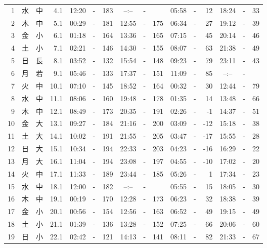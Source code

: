 \documentclass[12pt.a4j]{jsarticle}
\begin{document}
\begin{center}
\begin{table}[ht]
\begin{tabular}{|rc|cr|ccrccr|ccrccr|}
 \hline
 1 & 水 & 中 &  4.1 &  12:20 &-& 183  &  --:-- &-&     &   05:58 &-&  12  &   18:24 &-&  33  \\
 2 & 木 & 中 &  5.1 &  00:29 &-& 181  &  12:55 &-& 175  &   06:34 &-&  27  &   19:12 &-&  39  \\
 3 & 金 & 小 &  6.1 &  01:18 &-& 164  &  13:36 &-& 165  &   07:15 &-&  45  &   20:14 &-&  46  \\
 4 & 土 & 小 &  7.1 &  02:21 &-& 146  &  14:30 &-& 155  &   08:07 &-&  63  &   21:38 &-&  49  \\
 5 & 日 & 長 &  8.1 &  03:52 &-& 132  &  15:54 &-& 148  &   09:23 &-&  79  &   23:11 &-&  43  \\
 6 & 月 & 若 &  9.1 &  05:46 &-& 133  &  17:37 &-& 151  &   11:09 &-&  85  &   --:-- &-&     \\
 7 & 火 & 中 & 10.1 &  07:10 &-& 145  &  18:52 &-& 164  &   00:32 &-&  30  &   12:44 &-&  79  \\
 8 & 水 & 中 & 11.1 &  08:06 &-& 160  &  19:48 &-& 178  &   01:35 &-&  14  &   13:48 &-&  66  \\
 9 & 木 & 中 & 12.1 &  08:49 &-& 173  &  20:35 &-& 191  &   02:26 &-&  -1  &   14:37 &-&  51  \\
10 & 金 & 大 & 13.1 &  09:27 &-& 184  &  21:16 &-& 200  &   03:09 &-& -12  &   15:18 &-&  38  \\
11 & 土 & 大 & 14.1 &  10:02 &-& 191  &  21:55 &-& 205  &   03:47 &-& -17  &   15:55 &-&  28  \\
12 & 日 & 大 & 15.1 &  10:34 &-& 194  &  22:33 &-& 203  &   04:23 &-& -16  &   16:29 &-&  22  \\
13 & 月 & 大 & 16.1 &  11:04 &-& 194  &  23:08 &-& 197  &   04:55 &-& -10  &   17:02 &-&  20  \\
14 & 火 & 中 & 17.1 &  11:33 &-& 189  &  23:44 &-& 185  &   05:26 &-&   1  &   17:34 &-&  23  \\
15 & 水 & 中 & 18.1 &  12:00 &-& 182  &  --:-- &-&     &   05:55 &-&  15  &   18:05 &-&  30  \\
16 & 木 & 中 & 19.1 &  00:19 &-& 170  &  12:28 &-& 173  &   06:23 &-&  32  &   18:38 &-&  39  \\
17 & 金 & 小 & 20.1 &  00:56 &-& 154  &  12:56 &-& 163  &   06:52 &-&  49  &   19:15 &-&  49  \\
18 & 土 & 小 & 21.1 &  01:39 &-& 136  &  13:28 &-& 152  &   07:25 &-&  66  &   20:06 &-&  60  \\
19 & 日 & 小 & 22.1 &  02:42 &-& 121  &  14:13 &-& 141  &   08:11 &-&  82  &   21:33 &-&  67  \\

\end{tabular}
\end{table}
\end{center}
\end{document}
